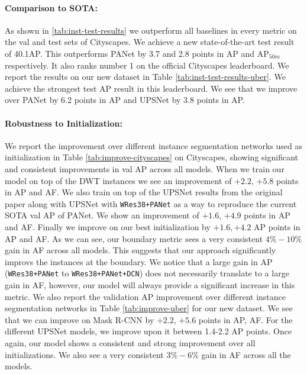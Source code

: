 \documentclass[10pt,twocolumn,letterpaper]{article}
\begin{document}
\paragraph{Comparison to SOTA:}
As shown in \ref{tab:inst-test-results} we outperform all baselines in every metric  on the val and test sets of Cityscapes.  
We achieve a new state-of-the-art test result of 40.1AP. This  outperforms PANet by 3.7 and 2.8 points in AP and AP$_{50m}$ respectively. It also ranks number 1 on the official Cityscapes leaderboard. 
We report the results on our new dataset in Table \ref{tab:inst-test-results-uber}. We achieve the strongest test AP result in this leaderboard. We see that we improve over PANet by 6.2 points in AP and UPSNet by 3.8 points in AP. 

\vspace{-2mm}

\paragraph{Robustness to Initialization:}
We  report the improvement over different instance segmentation networks used as initialization in Table \ref{tab:improve-cityscapes} on Cityscapes, showing  significant and consistent improvements in val AP across all models. When we train our model on top of the DWT \cite{bai2017deep} instances we see an improvement of $+2.2$, $+5.8$ points in AP and AF. We also train on top of the UPSNet results from the original paper along with UPSNet with \texttt{WRes38+PANet} as a way to reproduce the current SOTA val AP of PANet. We show an improvement of $+1.6$, $+4.9$ points in AP and AF. Finally we  improve on our best initialization by $+1.6, +4.2$ AP points in AP and AF. As we can see, our boundary metric sees a very consistent $4\%-10\%$ gain in AF across all  models. This suggests that our approach  significantly improvs the instances at the boundary. We notice that a large gain in AP (\texttt{WRes38+PANet} to \texttt{WRes38+PANet+DCN}) does not necessarily translate to a large gain in AF, however, our model will always provide a significant increase in this metric.
We also report the validation AP improvement over different instance segmentation networks in Table \ref{tab:improve-uber} for our new dataset. We see that we can improve on Mask R-CNN \cite{mask-rcnn} by $+2.2$, $+5.6$ points in AP, AF. For the different UPSNet models, we improve upon it between 1.4-2.2 AP points. Once again, our model shows a consistent and strong improvement over all initializations. We also see a very consistent $3\%-6\%$ gain in AF across all the models. 
\end{document}
